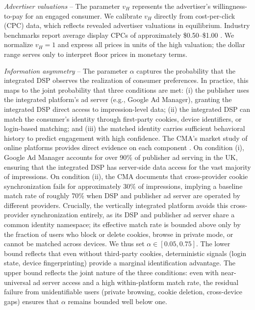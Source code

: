 \noindent \textit{Advertiser valuations} -- The parameter $v_H$ represents the advertiser's willingness-to-pay for an engaged consumer. We calibrate $v_H$ directly from cost-per-click (CPC) data, which reflects revealed advertiser valuations in equilibrium. Industry benchmarks report average display CPCs of approximately \$0.50--\$1.00 \parencite{irvineGoogleAdsBenchmarks}. We normalize $v_H = 1$ and express all prices in units of the high valuation; the dollar range serves only to interpret floor prices in monetary terms. \par

\noindent \textit{Information asymmetry} -- The parameter $\alpha$ captures the probability that the integrated DSP observes the realization of consumer preferences. In practice, this maps to the joint probability that three conditions are met: (i) the publisher uses the integrated platform's ad server (e.g., Google Ad Manager), granting the integrated DSP direct access to impression-level data; (ii) the integrated DSP can match the consumer's identity through first-party cookies, device identifiers, or login-based matching; and (iii) the matched identity carries sufficient behavioral history to predict engagement with high confidence. The CMA's market study of online platforms provides direct evidence on each component \parencite{competitionandmarketsauthorityOnlinePlatformsDigital2020}. On condition (i), Google Ad Manager accounts for over 90\% of publisher ad serving in the UK, ensuring that the integrated DSP has server-side data access for the vast majority of impressions. On condition (ii), the CMA documents that cross-provider cookie synchronization fails for approximately 30\% of impressions, implying a baseline match rate of roughly 70\% when DSP and publisher ad server are operated by different providers. Crucially, the vertically integrated platform avoids this cross-provider synchronization entirely, as its DSP and publisher ad server share a common identity namespace; its effective match rate is bounded above only by the fraction of users who block or delete cookies, browse in private mode, or cannot be matched across devices. We thus set $\alpha \in [0.05, 0.75]$. The lower bound reflects that even without third-party cookies, deterministic signals (login state, device fingerprinting) provide a marginal identification advantage. The upper bound reflects the joint nature of the three conditions: even with near-universal ad server access and a high within-platform match rate, the residual failure from unidentifiable users (private browsing, cookie deletion, cross-device gaps) ensures that $\alpha$ remains bounded well below one.\par

